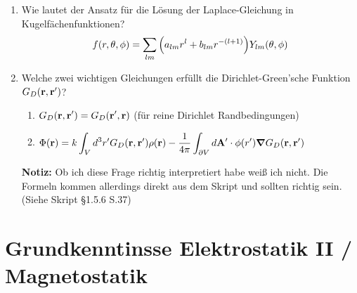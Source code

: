 \documentclass{scrartcl}
\newcommand{\ds}{\displaystyle}
\begin{document}
\begin{enumerate}
    \item Wie lautet der Ansatz für die Lösung der Laplace-Gleichung in
          Kugelfächenfunktionen?\\
          $$f(r,\theta,\phi)=
          \sum_{lm}\qty(a_{lm}r^l+b_{lm}r^{-(l+1)})Y_{lm}(\theta,\phi)$$
           
    \clearpage
    \item Welche zwei wichtigen Gleichungen erfüllt die Dirichlet-Green'sche
          Funktion $G_D(\vb r, \vb r')$?
          \begin{center}
          \begin{enumerate}
          \item $\ds G_D(\vb r, \vb r')= G_D(\vb r', \vb r)$ 
             (für reine Dirichlet Randbedingungen)\\
          \item $\ds \Phi(\vb r)=k\int_V d^3r' G_D(\vb r, \vb r')\rho(\vb r)
             -\frac{1}{4\pi}\int_{\partial V}d\vb A'\cdot\phi(r')
             \grad G_D(\vb r, \vb r')$\\
          \end{enumerate}
          \end{center}
          \textbf{Notiz:} Ob ich diese Frage richtig interpretiert habe 
          weiß ich nicht. Die Formeln kommen allerdings direkt aus dem
          Skript und sollten richtig sein.\\
          (Siehe Skript §1.5.6 S.37)
  \end{enumerate}
  \newpage

\section{Grundkenntinsse Elektrostatik II / Magnetostatik}
\end{document}
